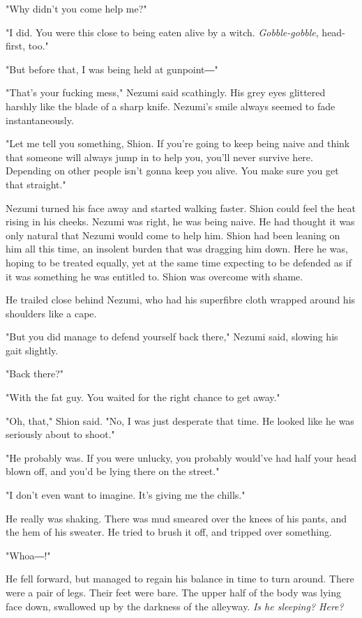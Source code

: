 "Why didn't you come help me?"

"I did. You were this close to being eaten alive by a witch.
\emph{Gobble-gobble}, head-first, too."

"But before that, I was being held at gunpoint―"

"That's your fucking mess," Nezumi said scathingly. His grey eyes
glittered harshly like the blade of a sharp knife. Nezumi's smile always
seemed to fade instantaneously.

"Let me tell you something, Shion. If you're going to keep being naive
and think that someone will always jump in to help you, you'll never
survive here. Depending on other people isn't gonna keep you alive. You
make sure you get that straight."

Nezumi turned his face away and started walking faster. Shion could feel
the heat rising in his cheeks. Nezumi was right, he was being naive. He
had thought it was only natural that Nezumi would come to help him.
Shion had been leaning on him all this time, an insolent burden that was
dragging him down. Here he was, hoping to be treated equally, yet at the
same time expecting to be defended as if it was something he was
entitled to. Shion was overcome with shame.

He trailed close behind Nezumi, who had his superfibre cloth wrapped
around his shoulders like a cape.

"But you did manage to defend yourself back there," Nezumi said, slowing
his gait slightly.

"Back there?"

"With the fat guy. You waited for the right chance to get away."

"Oh, that," Shion said. "No, I was just desperate that time. He looked
like he was seriously about to shoot."

"He probably was. If you were unlucky, you probably would've had half
your head blown off, and you'd be lying there on the street."

"I don't even want to imagine. It's giving me the chills."

He really was shaking. There was mud smeared over the knees of his
pants, and the hem of his sweater. He tried to brush it off, and tripped
over something.

"Whoa―!"

He fell forward, but managed to regain his balance in time to turn
around. There were a pair of legs. Their feet were bare. The upper half
of the body was lying face down, swallowed up by the darkness of the
alleyway. \emph{Is he sleeping? Here?}

